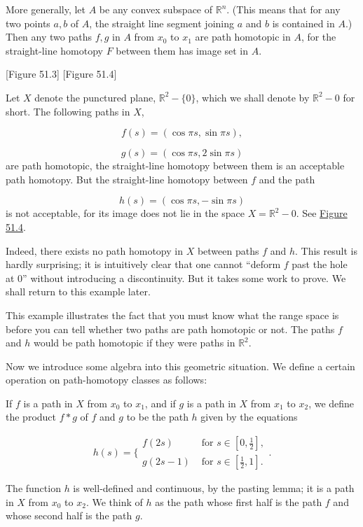 More generally, let \(A\) be any convex subspace of \(\mathbb{R}^{n}\). (This means that for any two points \(a,b\) of \(A\), the straight line segment joining \(a\) and \(b\) is contained in \(A\).) Then any two paths \(f,g\) in \(A\) from \(x_{0}\) to \(x_{1}\) are path homotopic in \(A\), for the straight-line homotopy \(F\) between them has image set in \(A\).

[Figure 51.3]
[Figure 51.4]
\begin{centeredblock*}
\begin{example}
\label{ex:\thesection.\theexample}
Let \(X\) denote the punctured plane, \(\mathbb{R}^{2} - \{ 0\}\), which we shall denote by \( \mathbb{R}^{2} - 0\) for short. The following paths in \(X\),

\[
f( s) = ( {\cos {\pi s},\sin {\pi s}}),
\]

\[
g( s) = ( {\cos {\pi s},2\sin {\pi s}})
\]
are path homotopic, the straight-line homotopy between them is an acceptable path homotopy. But the straight-line homotopy between \(f\) and the path

\[
h( s) = ( {\cos {\pi s}, - \sin {\pi s}})
\]
is not acceptable, for its image does not lie in the space \(X = \mathbb{R}^{2} - 0\). See \hyperref[fig:51.4]{Figure 51.4}.

Indeed, there exists no path homotopy in \(X\) between paths \(f\) and \(h\). This result is hardly surprising; it is intuitively clear that one cannot ``deform \(f\) past the hole at 0'' without introducing a discontinuity. But it takes some work to prove. We shall return to this example later.

This example illustrates the fact that you must know what the range space is before you can tell whether two paths are path homotopic or not. The paths \(f\) and \(h\) would be path homotopic if they were paths in \(\mathbb{R}^{2}\).
\end{example}
\end{centeredblock*}

Now we introduce some algebra into this geometric situation. We define a certain operation on path-homotopy classes as follows:

\begin{definition}
If \(f\) is a path in \(X\) from \(x_{0}\) to \(x_{1}\), and if \(g\) is a path in \(X\) from \(x_{1}\) to \(x_{2}\), we define the product \( f * g\) of \(f\) and \(g\) to be the path \(h\) given by the equations

\[
h( s) = \{ \begin{array}{ll} f( {2s}) & \text{ for }s \in [ {0,\frac{1}{2}}] , \\ g( {{2s} - 1}) & \text{ for }s \in [ {\frac{1}{2},1}] . \end{array}.
\]

The function \(h\) is well-defined and continuous, by the pasting lemma; it is a path in \(X\) from \(x_{0}\) to \(x_{2}\). We think of \(h\) as the path whose first half is the path \(f\) and whose second half is the path \(g\).
\end{definition}

